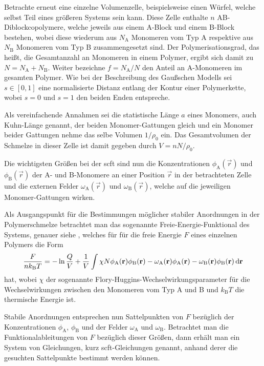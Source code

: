 Betrachte erneut eine einzelne Volumenzelle, beispielsweise einen Würfel, welche selbst Teil eines größeren Systems sein kann.
Diese Zelle enthalte $n$ AB-Diblockcopolymere, welche jeweils aus einem A-Block und einem B-Block bestehen, wobei diese wiederum aus $N_{\mathrm{A}}$ Monomeren vom Typ A respektive aus $N_{\mathrm{B}}$ Monomeren vom Typ B zusammengesetzt sind.
Der Polymerisationsgrad, das heißt, die Gesamtanzahl an Monomeren in einem Polymer, ergibt sich damit zu $N = N_{\mathrm{A}} + N_{\mathrm{B}}$.
Weiter bezeichne $f = N_{\mathrm{A}} / N$ den Anteil an A-Monomeren im gesamten Polymer.
Wie bei der Beschreibung des Gaußschen Modells sei $s \in [0, 1]$ eine normalisierte Distanz entlang der Kontur einer Polymerkette, wobei $s = 0$ und $s = 1$ den beiden Enden entspreche.

Als vereinfachende Annahmen sei die statistische Länge $a$ eines Monomers, auch Kuhn-Länge genannt, der beiden Monomer-Gattungen gleich und ein Monomer beider Gattungen nehme das selbe Volumen $1 / \rho_{0}$ ein.
Das Gesamtvolumen der Schmelze in dieser Zelle ist damit gegeben durch $V = n N / \rho_{0}$.

Die wichtigsten Größen bei der \ac{scft} sind nun die Konzentrationen $\phi_{\mathrm{A}}(\vec{r})$ und $\phi_{\mathrm{B}}(\vec{r})$ der A- und B-Monomere an einer Position $\vec{r}$ in der betrachteten Zelle und die externen Felder $\omega_{\mathrm{A}}(\vec{r})$ und $\omega_{\mathrm{B}}(\vec{r})$, welche auf die jeweiligen Monomer-Gattungen wirken.

Als Ausgangspunkt für die Bestimmungen möglicher stabiler Anordnungen in der Polymerschmelze betrachtet man das sogenannte Freie-Energie-Funktional des Systems, genauer siehe \cite{Matsen:2006ud,Fredrickson:2006th}, welches für für die freie Energie $F$ eines einzelnen Polymers die Form
\begin{equation}
\label{eq:freie_energie_funktional}
    \frac{F}{nk_{\mathrm{B}}T} = - \ln \frac{Q}{V} + \frac{1}{V} \int \chi N \phi_{\mathrm{A}}(\mathbf{r}) \phi_{\mathrm{B}}(\mathbf{r}) - \omega_{\mathrm{A}}(\mathbf{r}) \phi_{\mathrm{A}}(\mathbf{r}) - \omega_{\mathrm{B}}(\mathbf{r}) \phi_{\mathrm{B}}(\mathbf{r}) \mathop{}\!\mathrm{d} \mathbf{r}
\end{equation}
hat, wobei $\chi$ der sogenannte Flory-Huggins-Wechselwirkungsparameter für die Wechselwirkungen zwischen den Monomeren vom Typ A und B und $k_{\mathrm{B}} T$ die thermische Energie ist.

Stabile Anordnungen entsprechen nun Sattelpunkten von $F$ bezüglich der Konzentrationen $\phi_{\mathrm{A}}$, $\phi_{\mathrm{B}}$ und der Felder $\omega_{\mathrm{A}}$ und $\omega_{\mathrm{B}}$.
Betrachtet man die Funktionalableitungen von $F$ bezüglich dieser Größen, dann erhält man ein System von Gleichungen, kurz \ac{scft}-Gleichungen genannt, anhand derer die gesuchten Sattelpunkte bestimmt werden können.

